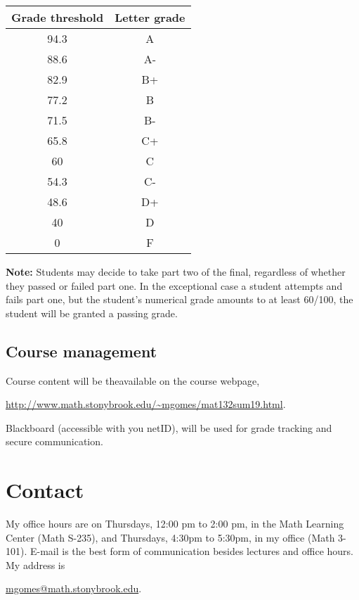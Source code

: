 \documentclass[11pt]{amsart}
\numberwithin{equation}{section}
\begin{document}
\begin{center}
\begin{tabular}{|c|c|}
\hline 
Grade threshold  & Letter grade \\ 
\hline 
94.3 & A \\ 
\hline 
88.6 & A- \\ 
\hline 
82.9 & B+ \\ 
\hline 
77.2 & B \\ 
\hline 
71.5 & B- \\ 
\hline 
65.8 & C+ \\ 
\hline 
60 & C \\ 
\hline 
54.3 & C- \\ 
\hline 
48.6 & D+ \\ 
\hline 
40 & D \\ 
\hline 
0 &  F  \\ 
\hline 
\end{tabular} 
\end{center}

\textbf{Note:} Students may decide to take part two of the final, regardless of whether they passed or failed part one. In the exceptional case a student attempts and fails part one, but the student's numerical grade amounts to at least 60/100, the student will be granted a passing grade.

\subsection{Course management}
Course content will be theavailable on the course webpage,
\begin{center}
\url{http://www.math.stonybrook.edu/~mgomes/mat132sum19.html}.
\end{center}
Blackboard (accessible with you netID), will be used for grade tracking and secure communication. 
\section{Contact}

My office hours are on Thursdays, 12:00 pm to 2:00 pm, in the Math Learning Center (Math S-235), and Thursdays, 4:30pm to 5:30pm, in my office (Math 3-101). E-mail is the best form of communication besides lectures and office hours. My address is
\begin{center}
\href{mailto: mgomes@math.stonybrook.edu}{ mgomes@math.stonybrook.edu}.
\end{center}
\end{document}
